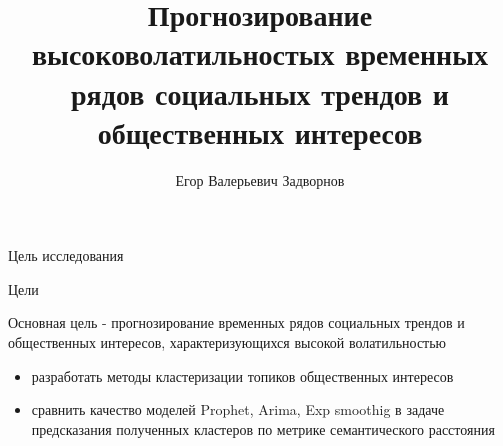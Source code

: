 \documentclass{beamer}
\title[Прогнозирование высоковолатильностых временных рядов социальных трендов и общественных интересов]{Прогнозирование высоковолатильностых временных рядов социальных трендов и общественных интересов}
\author[Е.\,В. Задворнов]{Егор Валерьевич Задворнов}
\institute{Московский физико-технический институт}
\date{\footnotesize
\par\smallskip\emph{Научный руководитель:} А.\,С.~Малков
\par\bigskip\small 2024}
\begin{document}
\begin{frame}
\thispagestyle{empty}
\maketitle
\end{frame}
\begin{frame}{Цель исследования}
     \begin{block}{Цели}

     Основная цель - прогнозирование временных рядов социальных трендов и общественных интересов, характеризующихся высокой волатильностью
     
     \begin{itemize}
         \item разработать методы кластеризации топиков общественных интересов
         \item сравнить качество моделей Prophet, Arima, Exp smoothig в задаче предсказания полученных кластеров по метрике семантического расстояния
     \end{itemize}
     \end{block}

 \end{frame}










\end{document}
